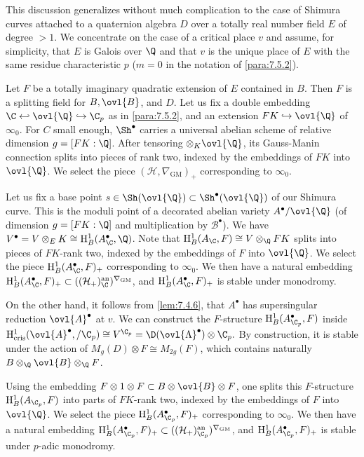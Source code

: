 \begin{para}\label{para:7.6.5}
 This discussion generalizes without much complication to the case of
 Shimura curves attached to a quaternion algebra $D$ over a totally real
 number field $E$ of degree $>1$. We concentrate on the case of a
 critical place $v$ and assume, for simplicity, that $E$ is Galois over
 $\Q$ and that $v$ is the unique place of $E$ with the same residue
 characteristic $p$ (\ie $m=0$ in the notation of \ref{para:7.5.2}).


 Let $F$ be a totally imaginary quadratic extension of $E$ contained in
 $B$. Then $F$ is a splitting field for $B,\ovl{B}$, and $D$. Let us fix
 a double embedding $\C \hookleftarrow \ovl{\Q} \hookrightarrow \C_p$ as
 in \ref{para:7.5.2}, and an extension $FK\hookrightarrow \ovl{\Q}$ of $\infty_0$.
 For $C$ small enough, $\Sh^\bullet$ carries a universal abelian scheme
 of relative dimension $g=[FK:\Q]$. After tensoring $\otimes_K
 \ovl{\Q}$, its Gauss-Manin connection splits into pieces of rank two,
 indexed by the embeddings of $FK$ into $\ovl{\Q}$. We select the piece
 $(\mathcal{H},\nabla_{\mathrm{GM}})_+$ corresponding to $\infty_0$.


 Let us fix a base point $s\in \Sh(\ovl{\Q})\subset \Sh^\bullet(\ovl{\Q})
 $ of our Shimura curve.  This is the moduli point of a decorated
 abelian variety $A^\bullet/\ovl{\Q}$ (of dimension $g=[FK:\Q]$ and
 multiplication by $\mathcal{B}^\bullet$). We have $V^\bullet=V\otimes_E
 K \cong \mathrm{H}^1_B(A^\bullet_\C,\Q)$.  Note that
 $\mathrm{H}^1_B(A_\C,F)\cong 
 V\otimes_\Q FK$ splits into pieces of $FK$-rank two, indexed by the
 embeddings of $F$ into $\ovl{\Q}$. We select the piece
 $\mathrm{H}^1_B(A^\bullet_\C,F)_+$ corresponding to $\infty_0$.  We
 then have a 
 natural embedding $\mathrm{H}^1_B(A^\bullet_\C,F)_+\subset
 ((\mathcal{H}_+)_{\C}^{\mathrm{an}})^{\nabla_{\mathrm{GM}}}$, and
 $\mathrm{H}^1_B(A^\bullet_\C,F)_+$ is stable under monodromy.


 On the other hand, it follows from \ref{lem:7.4.6}, that $A^\bullet$ has
 supersingular reduction $\ovl{A}^\bullet$ at $v$. We can construct the
 $F$-structure $\mathrm{H}^1_B(A^\bullet_{\C_p},F)$ inside
 $\mathrm{H}^1_{\mathrm{cris}}(\ovl{A}^\bullet,/\C_p)\cong
 V^{\C_p}=\D(\ovl{\Lambda}^\bullet)\otimes \C_p.$ 
 By construction, it is stable under the action of $M_g(D)\otimes F\cong
 M_{2g}(F)$, which contains naturally $B\otimes_\Q \ovl{B}\otimes_\Q F$.


 Using the embedding $F\otimes 1\otimes F\subset B\otimes \ovl{B} \otimes
 F$, one splits this $F$-structure $\mathrm{H}^1_B(A_{\C_p},F)$ into parts of
 $FK$-rank two, indexed by the embeddings of $F$ into $\ovl{\Q}$. We
 select the piece $\mathrm{H}^1_B(A^\bullet_{\C_p},F)_+$ corresponding to
 $\infty_0$.  We then have a natural embedding
 $\mathrm{H}^1_B(A^\bullet_{\C_p},F)_+\subset
 ((\mathcal{H}_+)_{\C_p}^{\mathrm{an}})^{\nabla_{\mathrm{GM}}}$, and
 $\mathrm{H}^1_B(A^\bullet_{\C_p},F)_+$ is stable under $p$-adic monodromy.
\end{para}

